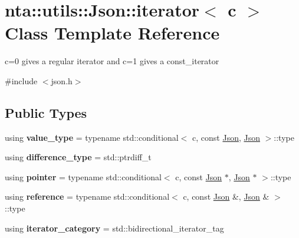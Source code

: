 \hypertarget{classnta_1_1utils_1_1Json_1_1iterator}{}\section{nta\+:\+:utils\+:\+:Json\+:\+:iterator$<$ c $>$ Class Template Reference}
\label{classnta_1_1utils_1_1Json_1_1iterator}


c=0 gives a regular iterator and c=1 gives a const\+\_\+iterator  




{\ttfamily \#include $<$json.\+h$>$}

\subsection*{Public Types}
\begin{DoxyCompactItemize}
\item 
\mbox{\label{classnta_1_1utils_1_1Json_1_1iterator_a4f7a3947bf631f014b6af1fba6e55650}} 
using {\bfseries value\+\_\+type} = typename std\+::conditional$<$ c, const \hyperlink{classnta_1_1utils_1_1Json}{Json}, \hyperlink{classnta_1_1utils_1_1Json}{Json} $>$\+::type
\item 
\mbox{\label{classnta_1_1utils_1_1Json_1_1iterator_a1de62fed92f8ed1612fa584b191dce13}} 
using {\bfseries difference\+\_\+type} = std\+::ptrdiff\+\_\+t
\item 
\mbox{\label{classnta_1_1utils_1_1Json_1_1iterator_a9724b64941d2b7097a56ae3bd26f6d6c}} 
using {\bfseries pointer} = typename std\+::conditional$<$ c, const \hyperlink{classnta_1_1utils_1_1Json}{Json} $\ast$, \hyperlink{classnta_1_1utils_1_1Json}{Json} $\ast$ $>$\+::type
\item 
\mbox{\label{classnta_1_1utils_1_1Json_1_1iterator_a0b2b7e34047092ab09ea3e6217cd52a9}} 
using {\bfseries reference} = typename std\+::conditional$<$ c, const \hyperlink{classnta_1_1utils_1_1Json}{Json} \&, \hyperlink{classnta_1_1utils_1_1Json}{Json} \& $>$\+::type
\item 
\mbox{\label{classnta_1_1utils_1_1Json_1_1iterator_a09be53898b73b32af274b07393dc9ce8}} 
using {\bfseries iterator\+\_\+category} = std\+::bidirectional\+\_\+iterator\+\_\+tag
\end{DoxyCompactItemize}
